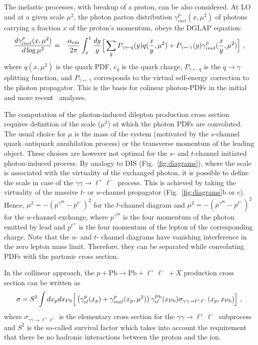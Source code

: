 The inelastic processes, with breakup of a proton, can be also considered.
At LO and at a given scale $\mu^2$, the photon parton distribution $\gamma^p_{inel}(x,\mu^2)$ of photons carrying a fraction $x$ of the proton's momentum, obeys the DGLAP equation:
\begin{eqnarray}
{d \gamma^p_{inel}(x,\mu^2) \over d \log \mu^2} =&& {\alpha_{\rm{em}} \over 2 \pi} \int_x^1 {dy \over y} 
\Big [ \sum_q P_{\gamma \leftarrow q}(y) 
 q ({x \over y}, \mu^2 )   + P_{\gamma \leftarrow \gamma}(y) \gamma^p_{inel}({x \over y},\mu^2) \Big ]~,
\end{eqnarray}
where $q (x,\mu^2)$ is the quark PDF, $e_q$ is the quark charge, $P_{\gamma \leftarrow q}$ is the $q\rightarrow\gamma$ splitting function, and $P_{\gamma \leftarrow \gamma}$ corresponds to the virtual self-energy correction to the photon propagator.
This is the basis for colinear photon-PDFs in the initial~\cite{Gluck:2002fi, Martin:2004dh} and more recent~\cite{Ball:2013hta, Martin:2014nqa, Schmidt:2014aba, Harland-Lang:2016kog, Giuli:2017oii, Manohar:2016nzj, Bertone:2017bme} analyses.

The computation of the photon-induced dilepton production cross section  requires definition of the  scale ($\mu^2$) at which the photon PDFs are convoluted.
The usual choice for $\mu$ is the mass of the system (motivated by the $s$-channel quark--antiquark annihilation process) or the transverse momentum of the leading object. 
These choices are however not optimal for the $s$- and $t$-channel initiated photon-induced process.
By analogy to DIS (Fig.~\ref{fig:diagrams}), where the scale is associated with the virtuality of the exchanged photon,
it is possible to define the scale in case of the $\gamma\gamma\rightarrow\ell^+\ell^-$ process.
This is achieved by taking the virtuality of the massive $t$- or $u$-channel propagator (Fig.~\ref{fig:diagrams}b or c).
Hence, $\mu^2 = -(p^{\gamma^{Pb}}-p^{\ell^-})^2$ for the $t$-channel diagram and $\mu^2 = -(p^{\gamma^{Pb}}-p^{\ell^+})^2$ for the $u$-channel exchange, where $p^{\gamma^{Pb}}$ is the four momentum
of the photon emitted by lead and $p^{\ell^{\pm}}$ is the four momentum of the lepton of the corresponding charge.
Note that the $u$- and $t$- channel diagrams have vanishing interference in the zero lepton mass limit. Therefore, they can be separated  while convoluting PDFs with the partonic cross section.

In the collinear approach, the $p+\textrm{Pb}\rightarrow \textrm{Pb} + \ell^+\ell^- + X$ production cross section can be written as
%
\begin{equation}
\sigma 
= S^2 \int dx_p dx_{\rm Pb} \Big[
\left ( \gamma^{p}_{el}(x_p) + \gamma^{p}_{inel}(x_p,\mu^2) \right)
 \gamma^{\rm Pb}_{el}(x_{\rm Pb})
\sigma_{\gamma \gamma \rightarrow \ell^+ \ell^-}(x_p, x_{\rm Pb})  \Big]~,
\label{collinear_factorization_formula}
\end{equation}
%
where $\sigma_{\gamma \gamma \rightarrow \ell^+ \ell^-}$
is the elementary cross section for the $\gamma \gamma \rightarrow \ell^+ \ell^-$ subprocess and $S^2$ is the so-called survival factor which takes into account the requirement that there be no hadronic interactions between the proton and the ion.

